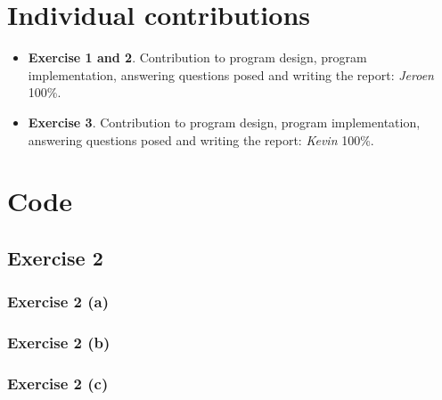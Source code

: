 \documentclass{article}
\begin{document}
\section*{Individual contributions}
\begin{itemize}
    \item \textbf{Exercise 1 and 2}. Contribution to program design, program implementation, answering questions posed and writing the report: \textit{Jeroen} 100\%.
    \item \textbf{Exercise 3}. Contribution to program design, program implementation, answering questions posed and writing the report: \textit{Kevin} 100\%.
\end{itemize}


\typeout{}


\newpage
\appendix
\section{Code}
\subsection{Exercise 2}


\subsubsection{Exercise 2 (a)}

\subsubsection{Exercise 2 (b)}

\subsubsection{Exercise 2 (c)}

\end{document}
